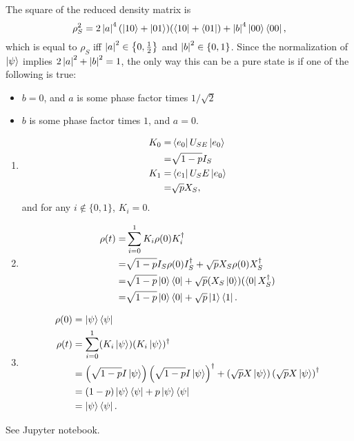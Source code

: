 \documentclass{article}
\begin{document}
\begin{enumerate}[label=(\alph*)]
        The square of the reduced density matrix is 
        \[ \rho_S^2 = 2 \left\lvert a \right\rvert^4 ( \left\lvert 10 \right\rangle + \left\lvert 01 \right\rangle) (\left\langle 10 \right\rvert + \left\langle 01 \right\rvert) + \left\lvert b \right\rvert^4 \left\lvert 00 \right\rangle\left\langle 00 \right\rvert, \]
        which is equal to $\rho_S$ iff $\left\lvert a \right\rvert^2 \in \left\{ 0, \frac{1}{2} \right\}$ and $\left\lvert b \right\rvert^2 \in \left\{ 0, 1 \right\}$. Since the normalization of $\left\lvert \psi \right\rangle$ implies $2\left\lvert a \right\rvert^2 + \left\lvert b \right\rvert^2=1$, the only way this can be a pure state is if one of the following is true:
        \begin{itemize}
            \item $b=0$, and $a$ is some phase factor times $1/\sqrt{2}$
            \item $b$ is some phase factor times $1$, and $a=0$.
        \end{itemize}
\end{enumerate}


\bigskip
\begin{prob}
\end{prob}
\begin{enumerate}[label=(\alph*)]
    \item \begin{align*}
            K_0 =& \left\langle e_0 \right\rvert U_{SE} \left\lvert e_0 \right\rangle \\
            =& \sqrt{1-p} I_S \\
            K_1 =& \left\langle e_1 \right\rvert U_SE \left\lvert e_0 \right\rangle \\
            =& \sqrt{p} X_S,
    \end{align*}
    and for any $i \not\in \{0,1\}$, $K_i=0$.
\item \begin{align*}
        \rho(t) =& \sum_{i=0}^1 K_i \rho(0) K_i^\dag \\
        =& \sqrt{1-p} I_S \rho(0) I_S^\dag + \sqrt{p} X_S \rho(0) X_S^\dag \\
        =& \sqrt{1-p} \left\lvert 0 \right\rangle\left\langle 0 \right\rvert + \sqrt{p} (X_S \left\lvert 0 \right\rangle)(\left\langle 0 \right\rvert X_S^\dag) \\
        =& \sqrt{1-p} \left\lvert 0 \right\rangle\left\langle 0 \right\rvert + \sqrt{p} \left\lvert 1 \right\rangle\left\langle 1 \right\rvert.
\end{align*}
    \item \begin{align*}
            \rho(0) &= \left\lvert \psi \right\rangle\left\langle \psi \right\rvert \\
            \rho(t) &= \sum_{i=0}^1 (K_i \left\lvert \psi \right\rangle) (K_i \left\lvert \psi \right\rangle)^\dag \\
                    &= \left( \sqrt{1-p} I \left\lvert \psi \right\rangle \right) \left( \sqrt{1-p} I \left\lvert \psi \right\rangle \right)^\dag + \left( \sqrt{p} X \left\lvert \psi \right\rangle \right) \left( \sqrt{p} X \left\lvert \psi \right\rangle \right)^\dag \\
                    &= (1-p) \left\lvert \psi \right\rangle\left\langle \psi \right\rvert + p \left\lvert \psi \right\rangle\left\langle \psi \right\rvert \\
                    &= \left\lvert \psi \right\rangle\left\langle \psi \right\rvert.
    \end{align*}
\end{enumerate}


\bigskip
\begin{prob}
\end{prob}
See Jupyter notebook.



\end{document}
